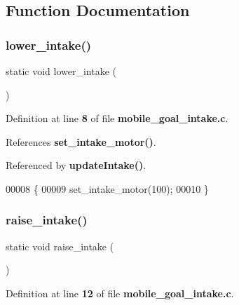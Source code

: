 \subsection{Function Documentation}
\mbox{\label{mobile__goal__intake_8c_afa91470a9891e48827fd62d18553c6ce}} 
\subsubsection{lower\+\_\+intake()}
{\footnotesize\ttfamily static void lower\+\_\+intake (\begin{DoxyParamCaption}{ }\end{DoxyParamCaption})\hspace{0.3cm}{\ttfamily [static]}}



Definition at line \textbf{ 8} of file \textbf{ mobile\+\_\+goal\+\_\+intake.\+c}.



References \textbf{ set\+\_\+intake\+\_\+motor()}.



Referenced by \textbf{ update\+Intake()}.


\begin{DoxyCode}
00008                            \{
00009   set_intake_motor(100);
00010 \}
\end{DoxyCode}
\mbox{\label{mobile__goal__intake_8c_a4899f9a8621015313e6312ce085da979}} 
\subsubsection{raise\+\_\+intake()}
{\footnotesize\ttfamily static void raise\+\_\+intake (\begin{DoxyParamCaption}{ }\end{DoxyParamCaption})\hspace{0.3cm}{\ttfamily [static]}}



Definition at line \textbf{ 12} of file \textbf{ mobile\+\_\+goal\+\_\+intake.\+c}.




